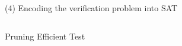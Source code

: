 \begin{frame}{}
	\begin{center}
		(4) Encoding the verification problem into SAT
	\end{center}
	\begin{columns}
		  \pause
		  \begin{center}
				 Pruning
				Efficient  Test
			\end{center}
	\end{columns}
\end{frame}

